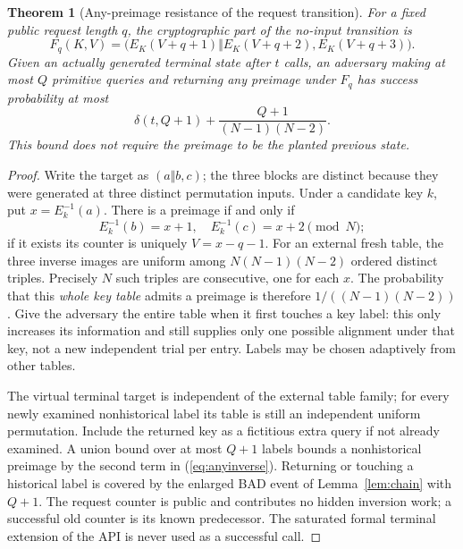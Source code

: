 \documentclass[11 pt,a 4 paper]{article}
\newtheorem{theorem}{Theorem}
\begin{document}
\begin{theorem}[Any-preimage resistance of the request transition]\label{thm:preimage}
For a fixed public request length $ q $, the cryptographic part of the no-input transition is
\begin{equation}
 F_q(K,V)=\big(E_K(V+q+1)\Vert E_K(V+q+2),E_K(V+q+3)\big).\label{eq:fq}
\end{equation}
Given an actually generated terminal state after $ t $ calls, an adversary making at most $ Q $ primitive queries and returning \emph{any} preimage under $ F_q $ has success probability at most
\begin{equation}
 \delta(t,Q+1)+\frac{Q+1}{(N-1)(N-2)}.\label{eq:anyinverse}
\end{equation}
This bound does not require the preimage to be the planted previous state.
\end{theorem}
\begin{proof}
Write the target as $(a\Vert b,c)$; the three blocks are distinct because they were generated at three distinct permutation inputs. Under a candidate key $ k $, put $ x=E_k^{-1}(a)$. There is a preimage if and only if
\[
 E_k^{-1}(b)=x+1,\quad E_k^{-1}(c)=x+2 \pmod N;
\]
if it exists its counter is uniquely $ V=x-q-1$. For an external fresh table, the three inverse images are uniform among $ N(N-1)(N-2)$ ordered distinct triples. Precisely $ N $ such triples are consecutive, one for each $ x $. The probability that this \emph{whole key table} admits a preimage is therefore $1/((N-1)(N-2))$. Give the adversary the entire table when it first touches a key label: this only increases its information and still supplies only one possible alignment under that key, not a new independent trial per entry. Labels may be chosen adaptively from other tables.

The virtual terminal target is independent of the external table family; for every newly examined nonhistorical label its table is still an independent uniform permutation. Include the returned key as a fictitious extra query if not already examined. A union bound over at most $ Q+1$ labels bounds a nonhistorical preimage by the second term in (\ref{eq:anyinverse}). Returning or touching a historical label is covered by the enlarged BAD event of Lemma~\ref{lem:chain} with $ Q+1$. The request counter is public and contributes no hidden inversion work; a successful old counter is its known predecessor. The saturated formal terminal extension of the API is never used as a successful call.
\end{proof}
\end{document}

